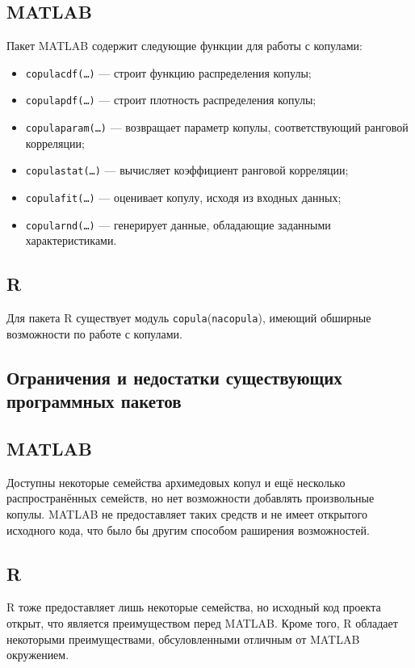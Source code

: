 \subsection*{MATLAB}
Пакет MATLAB содержит следующие функции для работы с копулами:
\begin{itemize}
	\item \texttt{copulacdf(\ldots)} --- строит функцию распределения копулы;
	\item \texttt{copulapdf(\ldots)} --- строит плотность распределения копулы;
	\item \texttt{copulaparam(\ldots)} --- возвращает параметр копулы, соответствующий ранговой корреляции;
	\item \texttt{copulastat(\ldots)} --- вычисляет коэффициент ранговой корреляции;
	\item \texttt{copulafit(\ldots)} --- оценивает копулу, исходя из входных данных;
	\item \texttt{copularnd(\ldots)} --- генерирует данные, обладающие заданными характеристиками.
\end{itemize}

\subsection*{R}
Для пакета R существует модуль \texttt{copula}(\texttt{nacopula}), имеющий обширные возможности \cite{Rcopula} по работе с копулами.

\subsection*{Ограничения и недостатки существующих программных пакетов}
\subsection*{MATLAB}
Доступны некоторые семейства архимедовых копул и ещё несколько распространённых семейств, но нет возможности добавлять произвольные копулы. MATLAB не предоставляет таких средств и не имеет открытого исходного кода, что было бы другим способом раширения возможностей.

\subsection*{R}
R тоже предоставляет лишь некоторые семейства, но исходный код проекта открыт, что является преимуществом перед MATLAB. Кроме того, R обладает некоторыми преимуществами, обсуловленными отличным от MATLAB окружением.
\clearpage
